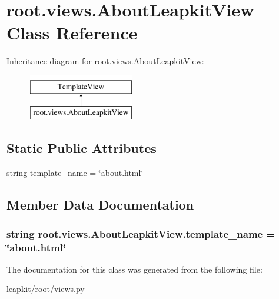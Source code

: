 \hypertarget{classroot_1_1views_1_1_about_leapkit_view}{\section{root.\-views.\-About\-Leapkit\-View Class Reference}
\label{classroot_1_1views_1_1_about_leapkit_view}
}
Inheritance diagram for root.\-views.\-About\-Leapkit\-View\-:\begin{figure}[H]
\begin{center}
\leavevmode
\includegraphics[height=2.000000cm]{classroot_1_1views_1_1_about_leapkit_view}
\end{center}
\end{figure}
\subsection*{Static Public Attributes}
\begin{DoxyCompactItemize}
\item 
string \hyperlink{classroot_1_1views_1_1_about_leapkit_view_a9bb80d3a1c10a942a1567139701b6293}{template\-\_\-name} = \char`\"{}about.\-html\char`\"{}
\end{DoxyCompactItemize}


\subsection{Member Data Documentation}
\hypertarget{classroot_1_1views_1_1_about_leapkit_view_a9bb80d3a1c10a942a1567139701b6293}{
\subsubsection[{template\-\_\-name}]{\setlength{\rightskip}{0pt plus 5cm}string root.\-views.\-About\-Leapkit\-View.\-template\-\_\-name = \char`\"{}about.\-html\char`\"{}\hspace{0.3cm}{\ttfamily [static]}}}\label{classroot_1_1views_1_1_about_leapkit_view_a9bb80d3a1c10a942a1567139701b6293}


The documentation for this class was generated from the following file\-:\begin{DoxyCompactItemize}
\item 
leapkit/root/\hyperlink{root_2views_8py}{views.\-py}\end{DoxyCompactItemize}
